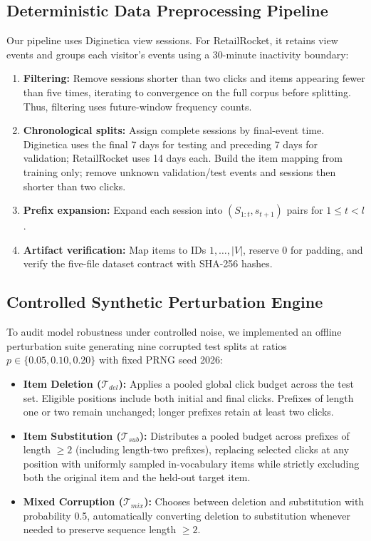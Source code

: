 \documentclass[11pt]{article}
\begin{document}
\subsection{Deterministic Data Preprocessing Pipeline}
Our pipeline uses Diginetica view sessions. For RetailRocket, it retains view events and groups each visitor's events using a 30-minute inactivity boundary:
\begin{enumerate}[leftmargin=*]
  \item \textbf{Filtering:} Remove sessions shorter than two clicks and items appearing fewer than five times, iterating to convergence on the full corpus before splitting. Thus, filtering uses future-window frequency counts.
  \item \textbf{Chronological splits:} Assign complete sessions by final-event time. Diginetica uses the final 7 days for testing and preceding 7 days for validation; RetailRocket uses 14 days each. Build the item mapping from training only; remove unknown validation/test events and sessions then shorter than two clicks.
  \item \textbf{Prefix expansion:} Expand each session into $(S_{1:t},s_{t+1})$ pairs for $1\leq t<l$.
  \item \textbf{Artifact verification:} Map items to IDs $1,\ldots,|V|$, reserve 0 for padding, and verify the five-file dataset contract with SHA-256 hashes.
\end{enumerate}

\subsection{Controlled Synthetic Perturbation Engine}
To audit model robustness under controlled noise, we implemented an offline perturbation suite generating nine corrupted test splits at ratios $p \in \{0.05, 0.10, 0.20\}$ with fixed PRNG seed 2026:
\begin{itemize}[leftmargin=*]
  \item \textbf{Item Deletion ($\mathcal{T}_{del}$):} Applies a pooled global click budget across the test set. Eligible positions include both initial and final clicks. Prefixes of length one or two remain unchanged; longer prefixes retain at least two clicks.
  \item \textbf{Item Substitution ($\mathcal{T}_{sub}$):} Distributes a pooled budget across prefixes of length $\ge 2$ (including length-two prefixes), replacing selected clicks at any position with uniformly sampled in-vocabulary items while strictly excluding both the original item and the held-out target item.
  \item \textbf{Mixed Corruption ($\mathcal{T}_{mix}$):} Chooses between deletion and substitution with probability 0.5, automatically converting deletion to substitution whenever needed to preserve sequence length $\ge 2$.
\end{itemize}
\end{document}
